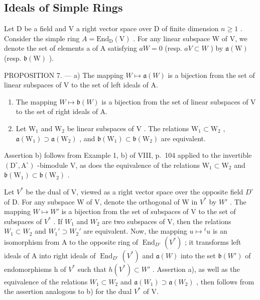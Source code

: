 \subsection{Ideals of Simple Rings}

Let D be a field and V a right vector space over D of finite dimension \(n \geqslant 1\) . Consider the simple ring \(A = \text{End}_{\text{D}}(\text{V})\) . For any linear subspace W of V, we denote the set of elements a of A satisfying \(aW = 0\) (resp. \(aV \subset W\) ) by \(\mathfrak{a}(\text{W})\) (resp. \(\mathfrak{b}(\text{W})\) ).

PROPOSITION 7. --- a) The mapping \(W \mapsto \mathfrak{a}(W)\) is a bijection from the set of linear subspaces of V to the set of left ideals of A.

\begin{enumerate}
\def\labelenumi{\alph{enumi})}
\setcounter{enumi}{1}
\item
  The mapping \(W \mapsto \mathfrak{b}(W)\) is a bijection from the set of linear subspaces of V to the set of right ideals of A.
\item
  Let \(\mathrm{W}_1\) and \(\mathrm{W}_2\) be linear subspaces of \(\mathrm{V}\) . The relations \(\mathrm{W}_1 \subset \mathrm{W}_2\) , \(\mathfrak{a}(\mathrm{W}_1) \supset \mathfrak{a}(\mathrm{W}_2)\) , and \(\mathfrak{b}(\mathrm{W}_1) \subset \mathfrak{b}(\mathrm{W}_2)\) are equivalent.
\end{enumerate}

Assertion b) follows from Example 1, b) of VIII, p.~104 applied to the invertible \((\mathrm{D}^{\circ},\mathrm{A}^{\circ})\) -bimodule V, as does the equivalence of the relations \(\mathrm{W}_1\subset \mathrm{W}_2\) and \(\mathfrak{b}(\mathrm{W}_1)\subset \mathfrak{b}(\mathrm{W}_2)\) .

Let \(V^{*}\) be the dual of V, viewed as a right vector space over the opposite field \(D^{\circ}\) of D. For any subspace W of V, denote the orthogonal of W in \(V^{*}\) by \(W'\) . The mapping \(W \mapsto W'\) is a bijection from the set of subspaces of V to the set of subspaces of \(V^{*}\) . If \(W_{1}\) and \(W_{2}\) are two subspaces of V, then the relations \(W_{1} \subset W_{2}\) and \(W_{1}' \supset W_{2}'\) are equivalent. Now, the mapping \(u \mapsto {}^{t}u\) is an isomorphism from A to the opposite ring of \(\operatorname{End}_{D^{\circ}}(V^{*})\) ; it transforms left ideals of A into right ideals of \(\operatorname{End}_{D^{\circ}}(V^{*})\) and \(\mathfrak{a}(W)\) into the set \(\mathfrak{b}(W')\) of endomorphisms h of \(V^{*}\) such that \(h(V^{*}) \subset W'\) . Assertion a), as well as the equivalence of the relations \(W_{1} \subset W_{2}\) and \(\mathfrak{a}(W_{1}) \supset \mathfrak{a}(W_{2})\) , then follows from the assertion analogous to b) for the dual \(V^{*}\) of V.

